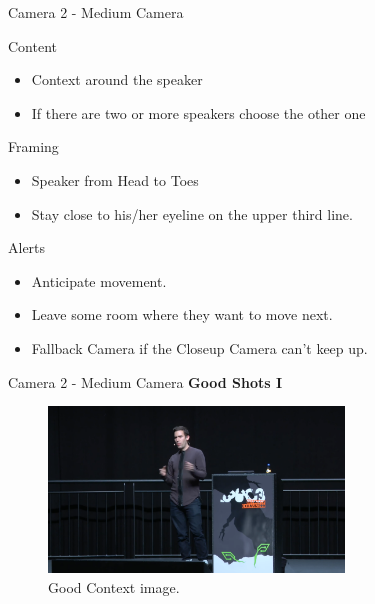 \documentclass[aspectratio=169]{beamer}
\begin{document}
\begin{frame}{Camera 2 - Medium Camera}
		\begin{block}{Content}
			\begin{itemize}
				\item Context around the speaker
				\item If there are two or more speakers choose the other one
			\end{itemize}
		\end{block}
		
		\begin{block}{Framing}
			\begin{itemize}
				\item Speaker from Head to Toes
				\item Stay close to his/her eyeline on the upper third line.
			\end{itemize}
		\end{block}

		\begin{alertblock}{Alerts}
			\begin{itemize}
				\item Anticipate movement.
				\item Leave some room where they want to move next.
				\item Fallback Camera if the Closeup Camera can't keep up.
			\end{itemize}
		\end{alertblock}
\end{frame}

\begin{frame}{Camera 2 - Medium Camera}
	\textbf{Good Shots I}
	\begin{figure} 
		\centering
		\includegraphics[width=0.7\textwidth]{images/medium1.png}
		\caption{Good Context image.}
	\end{figure}
\end{frame}
\end{document}
